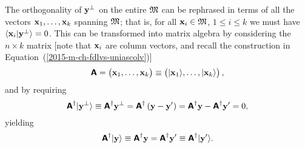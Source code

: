 The orthogonality of ${\bf y}^\perp$ on the entire ${\frak M}$ can be rephrased in terms
of all the vectors ${\bf x}_1,\ldots ,{\bf x}_k$ spanning ${\frak M}$; that is,
for all ${\bf x}_i \in {\frak M}$, $1\le i\le k$
we must have
$\langle {\bf x}_i \vert {\bf y}^\perp \rangle = 0$.
This can be transformed into matrix algebra by considering the $n \times k$ matrix
[note that ${\bf x}_i$ are column vectors,
and recall the construction in Equation~(\ref{2015-m-ch-fdlvs-uniascolv})]
\begin{equation}
\textsf{\textbf{A}} = \begin{pmatrix}
{\bf x}_1, \ldots ,{\bf x}_k
\end{pmatrix}
\equiv
\begin{pmatrix}
\vert {\bf x}_1\rangle , \ldots , \vert {\bf x}_k \rangle
\end{pmatrix},
\end{equation}
and by requiring
\begin{equation}
\textsf{\textbf{A}}^\dagger \vert {\bf y}^\perp \rangle   \equiv
 \textsf{\textbf{A}}^\dagger  {{\bf y}^\perp} =
 \textsf{\textbf{A}}^\dagger  \left({\bf y} - {\bf y}'\right) =
 \textsf{\textbf{A}}^\dagger {\bf y}  - \textsf{\textbf{A}}^\dagger {{\bf y}'}   =
0,
\end{equation}
yielding
\begin{equation}
 \textsf{\textbf{A}}^\dagger  \vert  {\bf y}  \rangle
\equiv
 \textsf{\textbf{A}}^\dagger   {\bf y}
=
\textsf{\textbf{A}}^\dagger  {{\bf y}'}
\equiv
\textsf{\textbf{A}}^\dagger \vert {\bf y}' \rangle .
\label{2015-m-ch-cfvs-opab1}
\end{equation}

